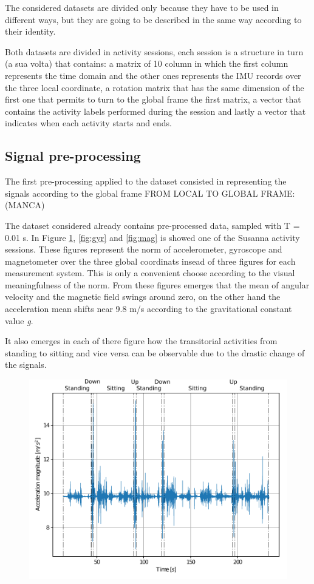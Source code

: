 \documentclass[10pt, conference, letterpaper]{IEEEtran}
\begin{document}
The considered datasets are divided only because they have to be used in different ways, but they are going to be described in the same way according to their identity.

Both datasets are divided in activity sessions, each session is a structure in turn (a sua volta) that contains: a matrix of 10 column in which the first column represents the time domain and the other ones represents the IMU records over the three local coordinate, a rotation matrix that has the same dimension of the first one that permits to turn to the global frame the first matrix, a vector that contains the activity labels performed during the session and lastly a vector that indicates when each activity starts and ends.


\subsection{Signal pre-processing}
The first pre-processing applied to the dataset consisted in representing the signals according to the global frame
FROM LOCAL TO GLOBAL FRAME: (MANCA)


The dataset considered already contains pre-processed data, sampled with T = 0.01 s. In Figure \ref{fig:acc}, \ref{fig:gyr} and \ref{fig:mag} is showed one of the Susanna activity sessions. These figures represent the norm of accelerometer, gyroscope and magnetometer over the three global coordinats insead of three figures for each measurement system. This is only a convenient choose according to the visual meaningfulness of the norm.
From these figures emerges that the mean of angular velocity and the magnetic field swings around zero, on the other hand the acceleration mean shifts near 9.8 m/s according to the gravitational constant value \textit{g}.

It also emerges in each of there figure how the transitorial activities from standing to sitting and vice versa can be observable due to the drastic change of the signals.

\begin{figure}
\includegraphics[scale=0.55]{acceleration_susanna.pdf}
\caption{}
\label{fig:acc}
\end{figure}
\end{document}
